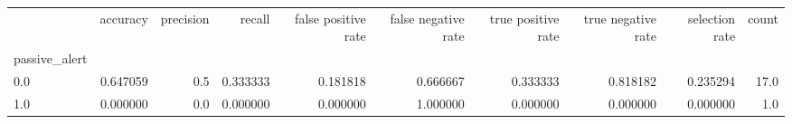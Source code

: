 \begin{tabular}{lrrrrrrrrr}
\toprule
{} &  accuracy &  precision &    recall &  false positive rate &  false negative rate &  true positive rate &  true negative rate &  selection rate &  count \\
passive\_alert &           &            &           &                      &                      &                     &                     &                 &        \\
\midrule
0.0           &  0.647059 &        0.5 &  0.333333 &             0.181818 &             0.666667 &            0.333333 &            0.818182 &        0.235294 &   17.0 \\
1.0           &  0.000000 &        0.0 &  0.000000 &             0.000000 &             1.000000 &            0.000000 &            0.000000 &        0.000000 &    1.0 \\
\bottomrule
\end{tabular}
